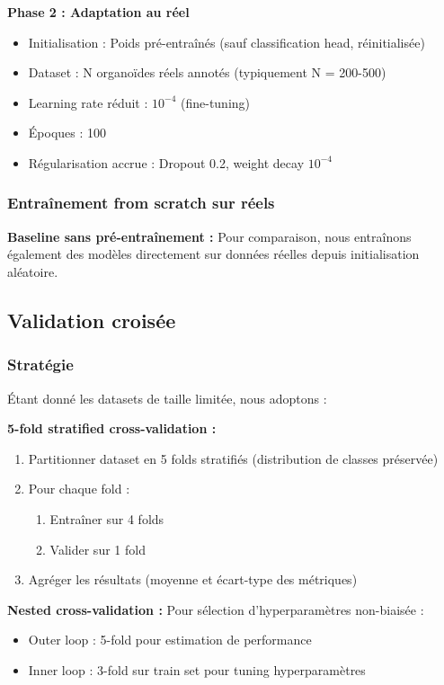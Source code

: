 \textbf{Phase 2 : Adaptation au réel}
\begin{itemize}
    \item Initialisation : Poids pré-entraînés (sauf classification head, réinitialisée)
    \item Dataset : N organoïdes réels annotés (typiquement N = 200-500)
    \item Learning rate réduit : $10^{-4}$ (fine-tuning)
    \item Époques : 100
    \item Régularisation accrue : Dropout 0.2, weight decay $10^{-4}$
\end{itemize}

\subsubsection{Entraînement from scratch sur réels}

\textbf{Baseline sans pré-entraînement :}
Pour comparaison, nous entraînons également des modèles directement sur données réelles depuis initialisation aléatoire.

\subsection{Validation croisée}

\subsubsection{Stratégie}

Étant donné les datasets de taille limitée, nous adoptons :

\textbf{5-fold stratified cross-validation :}
\begin{enumerate}
    \item Partitionner dataset en 5 folds stratifiés (distribution de classes préservée)
    \item Pour chaque fold :
    \begin{enumerate}
        \item Entraîner sur 4 folds
        \item Valider sur 1 fold
    \end{enumerate}
    \item Agréger les résultats (moyenne et écart-type des métriques)
\end{enumerate}

\textbf{Nested cross-validation :}
Pour sélection d'hyperparamètres non-biaisée :
\begin{itemize}
    \item Outer loop : 5-fold pour estimation de performance
    \item Inner loop : 3-fold sur train set pour tuning hyperparamètres
\end{itemize}

